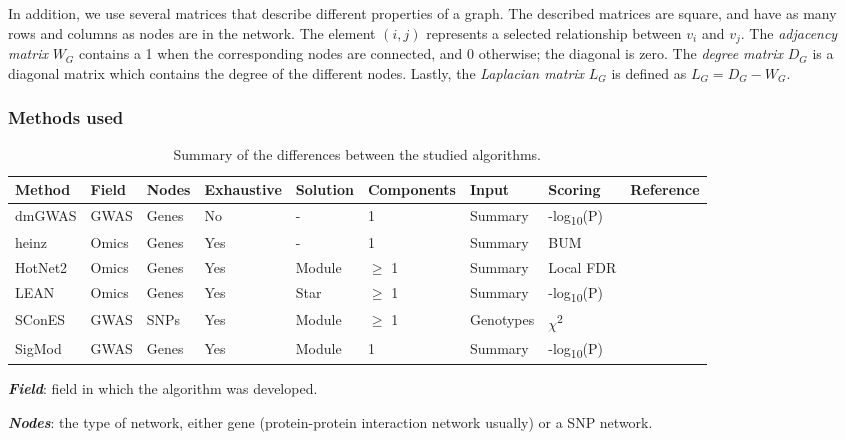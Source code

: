 \documentclass[twocolumn, 11pt, draft]{article}
\begin{document}
In addition, we use several matrices that describe different properties of a graph. The described matrices are square, and have as many rows and columns as nodes are in the network. The element $(i,j)$ represents a  selected relationship between $v_i$ and $v_j$. The \emph{adjacency matrix} $W_G$ contains a 1 when the corresponding nodes are connected, and 0 otherwise; the diagonal is zero. The \emph{degree matrix} $D_G$ is a diagonal matrix which contains the degree of the different nodes. Lastly, the \emph{Laplacian matrix} $L_G$ is defined as $L_G = D_G - W_G$.

\subsubsection{Methods used}
\label{methods:methods}

\begin{table}[htbp]
  \caption{\label{tab:method_comparison} Summary of the differences between the studied algorithms.}
  \centering
  \begin{threeparttable}
    \begin{tabular}{l|llllllll}
      Method & Field & Nodes & Exhaustive & Solution & Components & Input & Scoring & Reference\\
      \hline
      dmGWAS & GWAS & Genes & No & - & 1 & Summary & -log\textsubscript{10}(P) & \cite{jia_dmgwas:_2011}\\
      heinz & Omics & Genes & Yes & - & 1 & Summary & BUM & \cite{dittrich_identifying_2008}\\
      HotNet2 & Omics & Genes & Yes & Module & \(\ge\) 1 & Summary & Local FDR & \cite{leiserson_pan-cancer_2015}\\
      LEAN & Omics & Genes & Yes & Star & \(\ge\) 1 & Summary & -log\textsubscript{10}(P) & \cite{gwinner_network-based_2016}\\
      SConES & GWAS & SNPs & Yes & Module & \(\ge\) 1 & Genotypes & \(\chi\)\textsuperscript{2} & \cite{azencott_efficient_2013}\\
      SigMod & GWAS & Genes & Yes & Module & 1 & Summary & -log\textsubscript{10}(P) & \cite{liu_sigmod:_2017}\\
    \end{tabular}
    \begin{tablenotes}
      \item \textbf{\emph{Field}}: field in which the algorithm was developed.\\
      \item \textbf{\emph{Nodes}}: the type of network, either gene (protein-protein interaction network usually) or a SNP network.\\

\end{tablenotes}
\end{threeparttable}
\end{table}
\end{document}
